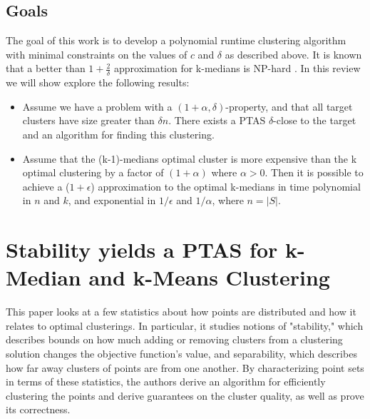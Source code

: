 \documentclass[paper=a4, fontsize=10.5pt]{scrartcl} %
\numberwithin{equation}{section} %
\numberwithin{figure}{section} %
\numberwithin{table}{section} %
\begin{document}
\subsection{Goals}

The goal of this work is to develop a polynomial runtime clustering algorithm with minimal constraints on the values of $c$ and $\delta$ as described above. It is known that a better than $1 + \frac{2}{\delta}$ approximation for k-medians is NP-hard \cite{JMS02}. In this review we will show explore the following results:

\begin{itemize}

\item Assume we have a problem with a $(1+\alpha, \delta)$-property, and that all target clusters have size greater than $\delta n$. There exists a PTAS $\delta$-close to the target and an algorithm for finding this clustering.

\item Assume that the (k-1)-medians optimal cluster is more expensive than the k optimal clustering by a factor of $(1+\alpha)$ where $\alpha > 0$. Then it is possible to achieve a ($1+\epsilon$) approximation to the optimal k-medians in time polynomial in $n$ and $k$, and exponential in $1/\epsilon$ and $1/\alpha$, where $n = |S|$.

\end{itemize}


\section{Stability yields a PTAS for k-Median and k-Means Clustering}

This paper looks at a few statistics about how points are distributed and how it relates to optimal clusterings.  In particular, it studies notions of "stability," which describes bounds on how much adding or removing clusters from a clustering solution changes the objective function's value, and separability, which describes how far away clusters of points are from one another.  By characterizing point sets in terms of these statistics, the authors derive an algorithm for efficiently clustering the points and derive guarantees on the cluster quality, as well as prove its correctness.
\end{document}
